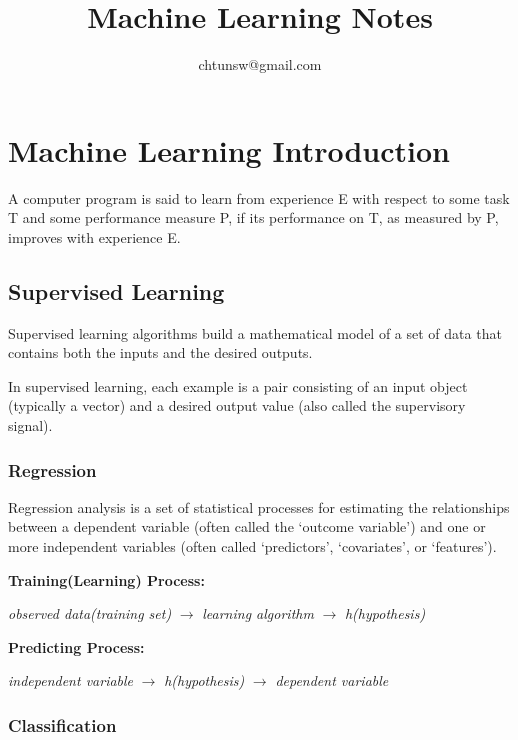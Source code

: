 \documentclass{article}
\title{Machine Learning Notes}
\author{chtunsw@gmail.com}
\date{}
\begin{document}
\maketitle

\clearpage

\tableofcontents{}

\clearpage

\section{Machine Learning Introduction}

A computer program is said to learn
from experience E with respect to some task T
and some performance measure P, if its
performance on T, as measured by P, improves
with experience E. 

\subsection{Supervised Learning}

Supervised learning algorithms build a mathematical model 
of a set of data that contains both the inputs and the desired 
outputs.

In supervised learning, each example is a 
pair consisting of an input object (typically a vector) 
and a desired output value (also called the supervisory signal).

\subsubsection{Regression}

Regression analysis is a set of statistical processes 
for estimating the relationships between a dependent 
variable (often called the `outcome variable') and one 
or more independent variables (often called `predictors', 
`covariates', or `features').

\textbf{Training(Learning) Process:}

\textit{observed data(training set)} $\rightarrow$ \textit{learning algorithm} $\rightarrow$ \textit{h(hypothesis)}

\textbf{Predicting Process:}

\textit{independent variable} $\rightarrow$ \textit{h(hypothesis)} $\rightarrow$ \textit{dependent variable}

\subsubsection{Classification}
\end{document}
